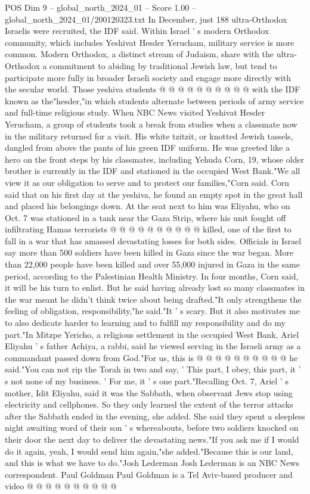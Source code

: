 \begin{textsample}{POS Dim 9 – global\_north\_2024\_01 – Score 1.00 – global\_north\_2024\_01/200120323.txt}
In December, just 188 ultra-Orthodox Israelis were recruited, the IDF said.
Within Israel ' s modern Orthodox community, which includes Yeshivat Hesder Yerucham, military service is more common.
Modern Orthodox, a distinct stream of Judaism, share with the ultra-Orthodox a commitment to abiding by traditional Jewish law, but tend to participate more fully in broader Israeli society and engage more directly with the secular world.
Those yeshiva students @ @ @ @ @ @ @ @ @ @ with the IDF known as the"hesder,"in which students alternate between periods of army service and full-time religious study.
When NBC News visited Yeshivat Hesder Yerucham, a group of students took a break from studies when a classmate now in the military returned for a visit.
His white tzitzit, or knotted Jewish tassels, dangled from above the pants of his green IDF uniform.
He was greeted like a hero on the front steps by his classmates, including Yehuda Corn, 19, whose older brother is currently in the IDF and stationed in the occupied West Bank."We all view it as our obligation to serve and to protect our families,"Corn said.
Corn said that on his first day at the yeshiva, he found an empty spot in the great hall and placed his belongings down.
At the seat next to him was Eliyahu, who on Oct. 7 was stationed in a tank near the Gaza Strip, where his unit fought off infiltrating Hamas terrorists @ @ @ @ @ @ @ @ @ @ killed, one of the first to fall in a war that has amassed devastating losses for both sides.
Officials in Israel say more than 500 soldiers have been killed in Gaza since the war began.
More than 22,000 people have been killed and over 55,000 injured in Gaza in the same period, according to the Palestinian Health Ministry.
In four months, Corn said, it will be his turn to enlist.
But he said having already lost so many classmates in the war meant he didn't think twice about being drafted."It only strengthens the feeling of obligation, responsibility,"he said."It ' s scary.
But it also motivates me to also dedicate harder to learning and to fulfill my responsibility and do my part."In Mitzpe Yericho, a religious settlement in the occupied West Bank, Ariel Eliyahu ' s father Achiya, a rabbi, said he viewed serving in the Israeli army as a commandant passed down from God."For us, this is @ @ @ @ @ @ @ @ @ @ he said."You can not rip the Torah in two and say, ' This part, I obey, this part, it ' s not none of my business. ' For me, it ' s one part."Recalling Oct. 7, Ariel ' s mother, Idit Eliyahu, said it was the Sabbath, when observant Jews stop using electricity and cellphones.
So they only learned the extent of the terror attacks after the Sabbath ended in the evening, she added.
She said they spent a sleepless night awaiting word of their son ' s whereabouts, before two soldiers knocked on their door the next day to deliver the devastating news."If you ask me if I would do it again, yeah, I would send him again,"she added."Because this is our land, and this is what we have to do."Josh Lederman Josh Lederman is an NBC News correspondent.
Paul Goldman Paul Goldman is a Tel Aviv-based producer and video @ @ @ @ @ @ @ @ @ @

\end{textsample}
